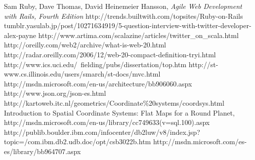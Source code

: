 \begin{thebibliography}{99}
   Sam Ruby, Dave Thomas, David Heinemeier Hansson, \emph{Agile Web Development with Rails, Fourth Edition}
    http://trends.builtwith.com/topsites/Ruby-on-Rails
   tumblr.yasulab.jp/post/10271634919/5-question-interview-with-twitter-developer-alex-payne
   http://www.artima.com/scalazine/articles/twitter\_on\_scala.html
   http://oreilly.com/web2/archive/what-is-web-20.html
   http://radar.oreilly.com/2006/12/web-20-compact-definition-tryi.html
   http://www.ics.uci.edu/~fielding/pubs/dissertation/top.htm
   http://st-www.cs.illinois.edu/users/smarch/st-docs/mvc.html
   http://msdn.microsoft.com/en-us/architecture/bb906060.aspx
   http://www.json.org/json-es.html
   http://kartoweb.itc.nl/geometrics/Coordinate\%20systems/coordsys.html
   Introduction to Spatial Coordinate Systems: Flat Maps for a Round Planet,\\ http://msdn.microsoft.com/en-us/library/cc749633(v=sql.100).aspx
   http://publib.boulder.ibm.com/infocenter/db2luw/v8/index.jsp?\\topic=/com.ibm.db2.udb.doc/opt/csb3022b.htm
   http://msdn.microsoft.com/es-es/library/bb964707.aspx

\end{thebibliography}
